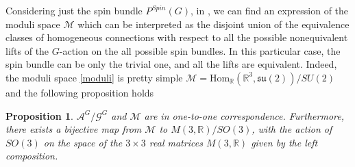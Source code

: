 \documentclass{article}
\numberwithin{equation}{section}
\newtheorem{proposition}{Proposition}[section]
\theoremstyle{definition}
\newcommand{\R}{\mathbb{R}}
\newcommand{\A}{\mathcal{A}}
\newcommand{\su}[1]{\mathfrak{su}(#1)}
\newcommand{\M}{\mathcal{M}}
\newcommand{\SP}[1]{P^{Spin}(#1)}
\begin{document}
Considering just the spin bundle $\SP{G}$, in \cite{Biswas_Teleman_2014}, we can find an expression of the moduli space $\mathcal{M}$ which can be interpreted as the disjoint union of the equivalence classes of homogeneous connections with respect to all the possible nonequivalent lifts of the $G$-action on the all possible spin bundles. In this particular case, the spin bundle can be only the trivial one, and all the lifts are equivalent. Indeed, the moduli space \eqref{moduli} is pretty simple $\mathcal{M}=\mathrm{Hom}_{\R}(\R^3,\su{2)}/SU(2)$ and the following proposition holds
\begin{proposition}
    $\A^G/\mathcal{G}^G$ and $\mathcal{M}$ are in one-to-one correspondence. Furthermore, there exists a bijective map from $\M$ to $M(3,\R)/SO(3)$, with the action of $SO(3)$ on the space of the $3\times 3$ real matrices $M(3,\R)$ given by the left composition.
\end{proposition}
\end{document}
